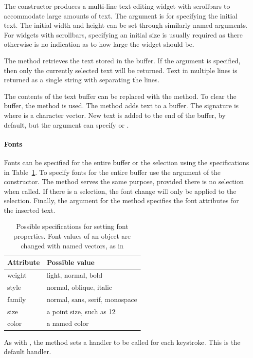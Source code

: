 The  constructor produces a multi-line text editing
widget with scrollbars to accommodate large amounts of text. The
 argument is for specifying the initial text. The
initial width and height can be set through similarly named
arguments. For widgets with scrollbars, specifying an initial size is
usually required as there otherwise is no indication as to how large
the widget should be.

The  method retrieves the text stored in the
buffer. If the argument  is specified, then only the
currently selected text will be returned. Text in multiple lines is
returned as a single string with \qcode{\backslashn} separating the lines.

The contents of the text buffer can be replaced with the
 method. To clear the buffer, the
 method is used. The 
method adds text to a buffer. The signature is 
where  is a character vector. New text is added to the end
of the buffer, by default, but the  argument
can specify  or .





\paragraph{Fonts}
Fonts can be specified for the entire buffer or the selection using
the specifications in Table~\ref{tab:gWidgets-font-properties}. To
specify fonts for the entire buffer use the
 argument of the constructor. The
 method serves the same purpose, provided
there is no selection when called. If there is a selection, the font
change will only be applied to the selection. Finally, the
 argument for the  method
specifies the font attributes for the inserted text.



\begin{table}
\centering
\label{tab:gWidgets-font-properties}
\caption{Possible specifications for setting font properties. Font values of an object are changed with named vectors, as in }
\begin{tabular}{@{}lp{}@{}}
\toprule

Attribute&Possible value\\
\midrule
weight&light, normal, bold\\style&normal, oblique, italic\\family&normal, sans, serif, monospace\\size&a point size, such as 12\\color&a named color
\\ \bottomrule
\end{tabular}
\end{table}
As with , the  method
sets a handler to be called for each keystroke. This is the default
handler.



